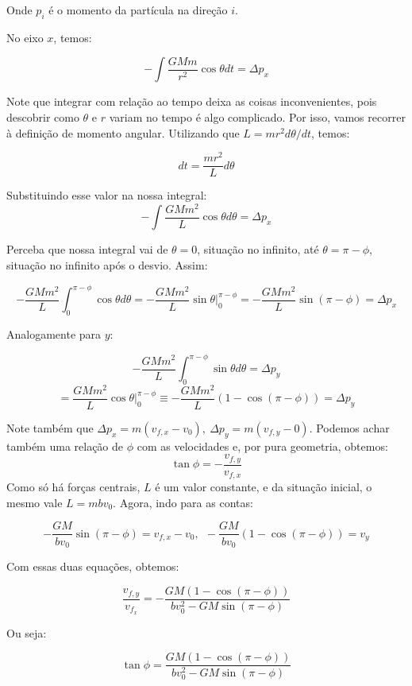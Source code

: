 \documentclass[11pt]{article}
\begin{document}
\begin{pproblem}
\begin{pssolution*}{}{}
\begin{alternativas}
            Onde \(p_i\) é o momento da partícula na direção \(i\).

            No eixo \(x\), temos:

            \[-\int \frac{GMm}{r^2}\cos\theta dt = \Delta p_x \]

            Note que integrar com relação ao tempo deixa as coisas inconvenientes, pois descobrir como \(\theta\) e \(r\) variam no tempo é algo complicado. Por isso, vamos recorrer à definição de momento angular. Utilizando que \(L = mr^2d\theta/dt\), temos:

            \[dt = \frac{mr^2}{L}d\theta\]

            Substituindo esse valor na nossa integral:
            \[-\int \frac{GMm^2}{L}\cos\theta d\theta = \Delta p_x\]

            Perceba que nossa integral vai de \(\theta = 0\), situação no infinito, até \(\theta = \pi - \phi\), situação no infinito após o desvio. Assim:

            \[-\frac{GMm^2}{L}\int_0^{\pi-\phi}\cos\theta d\theta = -\frac{GMm^2}{L}\sin\theta\big|_0^{\pi-\phi} = -\frac{GMm^2}{L}\sin(\pi-\phi) = \Delta p_x\]

            Analogamente para \(y\):

            \[-\frac{GMm^2}{L}\int_0^{\pi-\phi}\sin\theta d\theta = \Delta p_y\]
            \[=\frac{GMm^2}{L}\cos\theta\big|_0^{\pi-\phi} \equiv -\frac{GMm^2}{L}(1-\cos(\pi-\phi)) = \Delta p_y\]
        
            Note também que \(\Delta p_x = m(v_{f,x}-v_0), \ \Delta p_y = m(v_{f,y}-0)\). Podemos achar também uma relação de \(\phi\) com as velocidades e, por pura geometria, obtemos:
            \[\tan\phi =-\frac{v_{f,y}}{v_{f,x}}\]
            Como só há forças centrais, \(L\) é um valor constante, e da situação inicial, o mesmo vale \(L = mbv_0\). Agora, indo para as contas:

            \[-\frac{GM}{bv_0}\sin(\pi-\phi) = v_{f,x}-v_0, \ \ -\frac{GM}{bv_0}(1-\cos(\pi-\phi))=v_y\]
            
            Com essas duas equações, obtemos:

            \[\frac{v_{f,y}}{v_{f_x}}= -\frac{GM(1-\cos(\pi-\phi))}{bv_0^2-GM\sin(\pi-\phi)}\]

            Ou seja:

            \[\tan\phi = \frac{GM(1-\cos(\pi-\phi))}{bv_0^2-GM\sin(\pi-\phi)}\]


\end{alternativas}
\end{pssolution*}
\end{pproblem}
\end{document}
